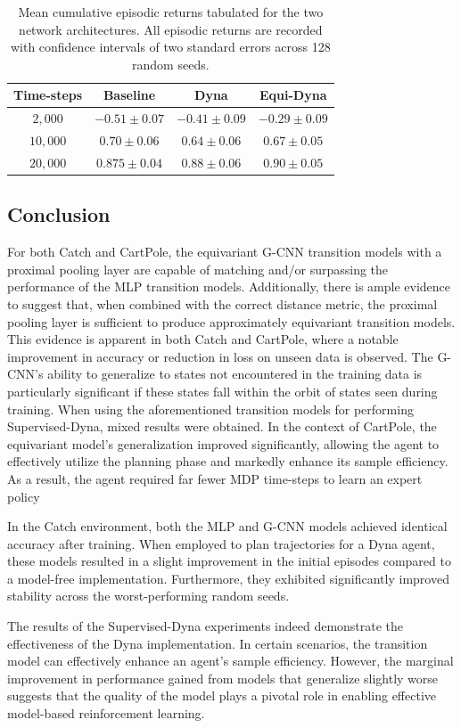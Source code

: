 \begin{table}
	\centering
	\begin{tabular}{|c|c|c|c|}
		\hline
		Time-steps & Baseline         & Dyna             & Equi-Dyna                 \\
		\hline
		$2, 000$   & $- 0.51\pm 0.07$ & $-0.41 \pm 0.09$ & $\mathbf{-0.29\pm 0.09}$  \\
		$10, 000$  & $0.70 \pm 0.06$  & $0.64\pm 0.06 $  & $\mathbf{0.67 \pm 0.05} $ \\
		$20,000$   & $0.875 \pm 0.04$ & $0.88\pm 0.06$   & $\mathbf{0.90\pm 0.05}$   \\
		\hline
	\end{tabular}
	\caption{Mean cumulative episodic returns tabulated for the two network architectures. All episodic returns are recorded with confidence intervals of two standard errors across 128 random seeds.}
	\label{tab:Supervised-Dyna-catch}
\end{table}

\subsection{Conclusion}
For both Catch and CartPole, the equivariant G-CNN transition models with a proximal pooling layer are capable of matching and/or surpassing the performance of the MLP transition models. Additionally, there is ample evidence to suggest that, when combined with the correct distance metric, the proximal pooling layer is sufficient to produce approximately equivariant transition models. This evidence is apparent in both Catch and CartPole, where a notable improvement in accuracy or reduction in loss on unseen data is observed. The G-CNN's ability to generalize to states not encountered in the training data is particularly significant if these states fall within the orbit of states seen during training.
When using the aforementioned transition models for performing Supervised-Dyna, mixed results were obtained. In the context of CartPole, the equivariant model's generalization improved significantly, allowing the agent to effectively utilize the planning phase and markedly enhance its sample efficiency. As a result, the agent required far fewer MDP time-steps to learn an expert policy

In the Catch environment, both the MLP and G-CNN models achieved identical accuracy after training. When employed to plan trajectories for a Dyna agent, these models resulted in a slight improvement in the initial episodes compared to a model-free implementation. Furthermore, they exhibited significantly improved stability across the worst-performing random seeds.

The results of the Supervised-Dyna experiments indeed demonstrate the effectiveness of the Dyna implementation. In certain scenarios, the transition model can effectively enhance an agent's sample efficiency. However, the marginal improvement in performance gained from models that generalize slightly worse suggests that the quality of the model plays a pivotal role in enabling effective model-based reinforcement learning. %


